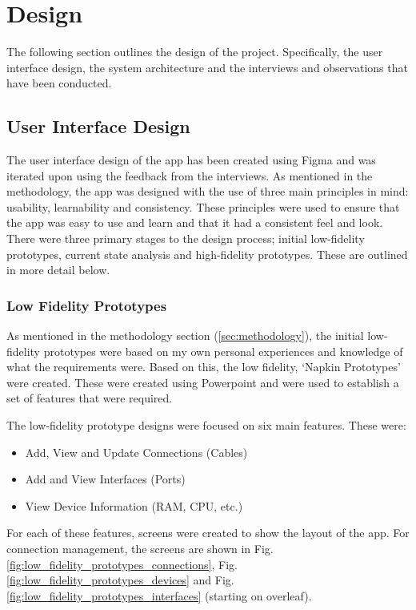 \documentclass [11pt,a4paper]{article}
\begin{document}
\section{Design}
\label{sec:design}
The following section outlines the design of the project. Specifically, the user interface design, the system architecture and the interviews and observations that have been conducted.

\subsection{User Interface Design}
\label{sec:ui_design}
The user interface design of the app has been created using Figma and was iterated upon using the feedback from the interviews. As mentioned in the methodology, the app was designed with the use of three main principles in mind: usability, learnability and consistency. These principles were used to ensure that the app was easy to use and learn and that it had a consistent feel and look. There were three primary stages to the design process; initial low-fidelity prototypes, current state analysis and high-fidelity prototypes. These are outlined in more detail below. 

\subsubsection{Low Fidelity Prototypes}
\label{sec:ui_design_initial_prototypes}
As mentioned in the methodology section (\ref{sec:methodology}), the initial low-fidelity prototypes were based on my own personal experiences and knowledge of what the requirements were. Based on this, the low fidelity, `Napkin Prototypes' were created. These were created using Powerpoint and were used to establish a set of features that were required. 

The low-fidelity prototype designs were focused on six main features. These were:
\begin{itemize}[noitemsep]
    \item Add, View and Update Connections (Cables)
    \item Add and View Interfaces (Ports)
    \item View Device Information (RAM, CPU, etc.)
\end{itemize}

For each of these features, screens were created to show the layout of the app. For connection management, the screens are shown in Fig.\ref{fig:low_fidelity_prototypes_connections}, Fig.\ref{fig:low_fidelity_prototypes_devices} and Fig.\ref{fig:low_fidelity_prototypes_interfaces} (starting on overleaf). 
\end{document}
